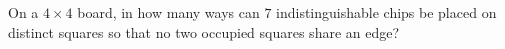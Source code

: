 On a $4\times4$ board, in how many ways can $7$ indistinguishable chips be placed on distinct squares so that no two occupied squares share an edge?
